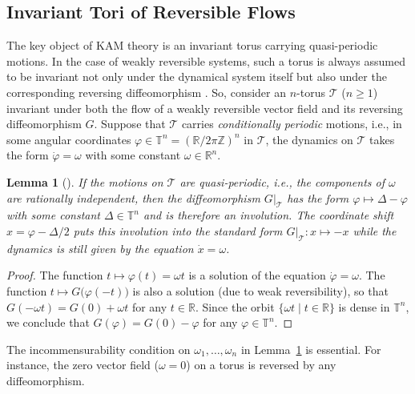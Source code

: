 \documentclass[12pt,reqno]{amsart}
\newtheorem{lem}{Lemma} \newtheorem{thm}{Theorem}
\theoremstyle{definition}
\begin{document}
\subsection{Invariant Tori of Reversible Flows}\label{tori}

The key object of KAM theory is an invariant torus carrying quasi-periodic
motions. In the case of weakly reversible systems, such a torus is always
assumed to be invariant not only under the dynamical system itself but also
under the corresponding reversing diffeomorphism \cite{AS86,S86,S98,S11}. So,
consider an $n$-torus ${\mathcal T}$ ($n{\geqslant} 1$) invariant under both the flow of a
weakly reversible vector field and its reversing diffeomorphism $G$. Suppose
that ${\mathcal T}$ carries \emph{conditionally periodic} motions, i.e., in some
angular coordinates ${\varphi}\in{\mathbb T}^n=({\mathbb R}/2\pi{\mathbb Z})^n$ in ${\mathcal T}$, the dynamics on
${\mathcal T}$ takes the form $\dot{\varphi}=\omega$ with some constant $\omega\in{\mathbb R}^n$.

\begin{lem}[\cite{BHS96Gro,BHS96LNM,S86}]\label{lemNF}
If the motions on ${\mathcal T}$ are \emph{quasi-periodic}, i.e., the components of
$\omega$ are rationally independent, then the diffeomorphism $G|_{\mathcal T}$ has
the form ${\varphi}\mapsto\Delta-{\varphi}$ with some constant $\Delta\in{\mathbb T}^n$ and is
therefore an involution. The coordinate shift $x={\varphi}-\Delta/2$ puts this
involution into the standard form $G|_{\mathcal T}:x\mapsto-x$ while the dynamics is
still given by the equation $\dot{x}=\omega$.
\end{lem}

\begin{proof}
The function $t\mapsto{\varphi}(t)=\omega t$ is a solution of the equation
$\dot{\varphi}=\omega$. The function $t\mapsto G\bigl({\varphi}(-t)\bigr)$ is also a
solution (due to weak reversibility), so that $G(-\omega t)=G(0)+\omega t$ for
any $t\in{\mathbb R}$. Since the orbit $\{\omega t \mid t\in{\mathbb R}\}$ is dense in
${\mathbb T}^n$, we conclude that $G({\varphi})=G(0)-{\varphi}$ for any ${\varphi}\in{\mathbb T}^n$.
\end{proof}

The incommensurability condition on $\omega_1,\ldots,\omega_n$ in
Lemma~\ref{lemNF} is essential. For instance, the zero vector field
($\omega=0$) on a torus is reversed by any diffeomorphism.
\end{document}

